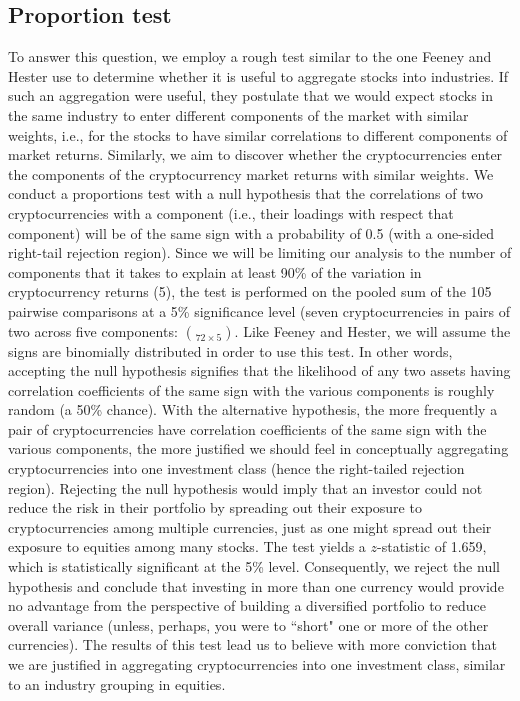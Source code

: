 \documentclass[12pt,twoside]{article}
\begin{document}
\subsection{Proportion test}
To answer this question, we employ a rough test similar to the one Feeney and Hester use to determine whether it is useful to aggregate stocks into industries. If such an aggregation were useful, they postulate that we would expect stocks in the same industry to enter different components of the market with similar weights, i.e., for the stocks to have similar correlations to different components of market returns. Similarly, we aim to discover whether the cryptocurrencies enter the components of the cryptocurrency market returns with similar weights. We conduct a proportions test with a null hypothesis that the correlations of two cryptocurrencies with a component (i.e., their loadings with respect that component) will be of the same sign with a probability of 0.5 (with a one-sided right-tail rejection region). Since we will be limiting our analysis to the number of components that it takes to explain at least 90\% of the variation in cryptocurrency returns (5), the test is performed on the pooled sum of the 105 pairwise comparisons at a 5\% significance level (seven cryptocurrencies in pairs of two across five components: $\choose{7}{2} \times 5$. Like Feeney and Hester, we will assume the signs are binomially distributed in order to use this test.
\bigbreak
In other words, accepting the null hypothesis signifies that the likelihood of any two assets having correlation coefficients of the same sign with the various components is roughly random (a 50\% chance). With the alternative hypothesis, the more frequently a pair of cryptocurrencies have correlation coefficients of the same sign with the various components, the more justified we should feel in conceptually aggregating cryptocurrencies into one investment class (hence the right-tailed rejection region). Rejecting the null hypothesis would imply that an investor could not reduce the risk in their portfolio by spreading out their exposure to cryptocurrencies among multiple currencies, just as one might spread out their exposure to equities among many stocks. The test yields a $z$-statistic of 1.659, which is statistically significant at the 5\% level. Consequently, we reject the null hypothesis and conclude that investing in more than one currency would provide no advantage from the perspective of building a diversified portfolio to reduce overall variance (unless, perhaps, you were to ``short" one or more of the other currencies). The results of this test lead us to believe with more conviction that we are justified in aggregating cryptocurrencies into one investment class, similar to an industry grouping in equities.
\end{document}
